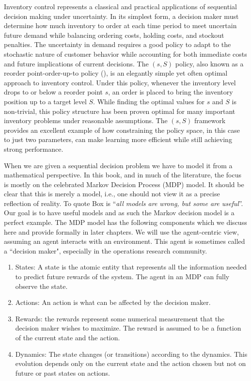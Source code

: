 \begin{example}
Inventory control represents a classical and practical applications of sequential decision making under uncertainty. In its simplest form, a decision maker must determine how much inventory to order at each time period to meet uncertain future demand while balancing ordering costs, holding costs, and stockout penalties. The uncertainty in demand requires a good policy to adapt to the stochastic nature of customer behavior while accounting for both immediate costs and future implications of current decisions.
The $(s,S)$ policy, also known as a reorder point-order-up-to policy (\cite{scarf1959optimality}), is an elegantly simple yet often optimal approach to inventory control. Under this policy, whenever the inventory level drops to or below a reorder point $s$, an order is placed to bring the inventory position up to a target level $S$. While finding the optimal values for $s$ and $S$ is non-trivial, this policy structure has been proven optimal for many important inventory problems under reasonable assumptions. The $(s,S)$ framework provides an excellent example of how constraining the policy space, in this case to just two parameters, can make learning more efficient while still achieving strong performance. \end{example}
When we are given a sequential decision problem we have to model it from a mathematical perspective. In this book, and in much of the literature, the focus is mostly on the celebrated Markov Decision Process (MDP) model. It should be clear that this is merely a model, i.e., one should not view it as a precise reflection of reality. To quote Box is ``{\it all models are wrong, but some are useful}''. Our goal is to have useful models and as such the Markov decision model is a perfect example. The MDP model has the following components which we discuss here and provide formally in later chapters. We will use the agent-centric view, assuming an agent interacts with an environment. This agent is sometimes called a ``decision maker", especially in the operations research community. 
\begin{enumerate}
    \item States: A state is the atomic entity that represents all the information needed to predict future rewards of the system. The agent in an MDP can fully observe the state.
    \item Actions: An action is what can be affected by the decision maker.
    \item Rewards: the rewards represent some numerical measurement that the decision maker wishes to maximize. The reward is assumed to be a function of the current state and the action.
    \item Dynamics: The state changes (or transitions) according to the dynamics. This evolution depends only on the current state and the action chosen but not on future or past states on actions.  
\end{enumerate}


